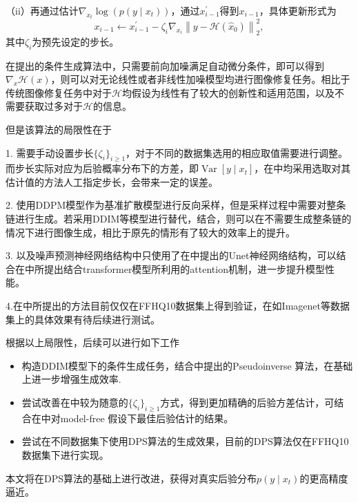 （ii）再通过估计$\nabla_{x_t}\log(p(y\mid x_t))$，通过$x_{i-1}^{\prime}$得到$x_{i-1}$，具体更新形式为
\begin{equation}
    x_{i-1} \leftarrow x_{i-1}^{\prime}-\zeta_i \nabla_{x_i}\left\|y-\mathcal{H}\left(\hat{x}_0\right)\right\|_2^2, \label{update 2 DPS}
\end{equation}
其中$\zeta_i$为预先设定的步长。

在\cite{Inverse}提出的条件生成算法中，只需要前向加噪满足自动微分条件，即可以得到$\nabla_x\mathcal{H}(x)$，则可以对无论线性或者非线性加噪模型均进行图像修复任务。相比于传统图像修复任务中对于$\mathcal{H}$均假设为线性有了较大的创新性和适用范围，以及不需要获取过多对于$\mathcal{H}$的信息。     

但是该算法的局限性在于      


1. 需要手动设置步长$\{\zeta_i\}_{i\geq 1}$，对于不同的数据集选用的相应取值需要进行调整。 而步长实际对应为后验概率分布下的方差，即$\operatorname{Var}\left[y\mid x_t\right]$，在\cite{song2023pseudoinverse,Inverse}中均采用选取对其估计值的方法人工指定步长，会带来一定的误差。   


2. 使用DDPM模型作为基准扩散模型进行反向采样，但是采样过程中需要对整条链进行生成。若采用DDIM等模型进行替代，结合\cite{DDIM}，则可以在不需要生成整条链的情况下进行图像生成，相比于原先的情形有了较大的效率上的提升。   

3. 以及噪声预测神经网络结构中只使用了在\cite{Unet}中提出的Unet神经网络结构，可以结合在\cite{DDIM,VAE_diffusion}中所提出结合transformer模型所利用的attention机制，进一步提升模型性能。     

4.在\cite{Inverse}中所提出的方法目前仅仅在FFHQ10数据集上得到验证，在如Imagenet等数据集上的具体效果有待后续进行测试。    

根据以上局限性，后续可以进行如下工作
\begin{itemize}
    \item 构造DDIM模型下的条件生成任务，结合\cite{song2023pseudoinverse}中提出的Pseudoinverse 算法，在\cite{Inverse}基础上进一步增强生成效率.
    \item  尝试改善在\cite{Inverse}中较为随意的$\{\zeta_i\}_{i\geq 1}$方式，得到更加精确的后验方差估计，可结合在\cite{Analytic_DPM}中对model-free 假设下最佳后验估计的结果。
    \item 尝试在不同数据集下使用DPS算法的生成效果，目前的DPS算法仅在FFHQ10数据集下进行实现。    
\end{itemize}
本文将在DPS算法\cite{Inverse}的基础上进行改进，获得对真实后验分布$p(y\mid x_t)$的更高精度逼近。